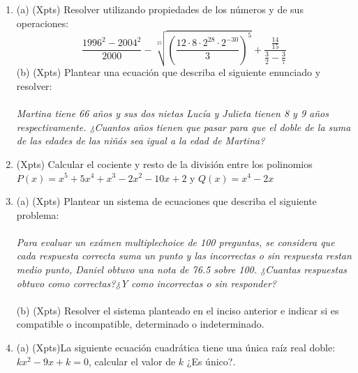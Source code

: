 \documentclass[a4paper]{article}
\begin{document}
\begin{enumerate}
        \item (a) (Xpts) Resolver utilizando propiedades de los números y de sus operaciones:
        \begin{equation*}
                \frac{1996^2-2004^2}{2000}-\sqrt[15]{\left(\frac{12\cdot 8\cdot 2^{28} \cdot 2^{-30}}{3}\right)^5} + \frac{\frac{14}{15}}{\frac{3}{2}-\frac{3}{7}}
        \end{equation*}
        (b) (Xpts) Plantear una ecuación que describa el siguiente enunciado y resolver:\\\\
         \textit{Martina tiene 66 años y sus dos nietas Lucía y Julieta tienen 8 y 9 años respectivamente. ¿Cuantos años tienen que pasar para que el doble de la suma de las edades de las niñás sea igual a la edad de Martina?}
        \item (Xpts) Calcular el cociente y resto de la división entre los polinomios $P(x)=x^5+5x^4+x^3-2x^2-10x+2$ y $Q(x)=x^4-2x$
        \item (a) (Xpts) Plantear un sistema de ecuaciones que describa el siguiente problema:\\\\
        \textit{Para evaluar un exámen multiplechoice de 100 preguntas, se considera que cada respuesta correcta suma un punto y las incorrectas o sin respuesta restan medio punto, Daniel obtuvo una nota de 76.5 sobre 100. ¿Cuantas respuestas obtuvo como correctas?¿Y como incorrectas o sin responder?}\\\\
        (b) (Xpts) Resolver el sistema planteado en el inciso anterior e indicar si es compatible o incompatible, determinado o indeterminado.
        \item (a) (Xpts)La siguiente ecuación cuadrática tiene una única raíz real doble: $k x^2 - 9x + k = 0$, calcular el valor de $k$ ¿Es único?.\\\\

\end{enumerate}
\end{document}
